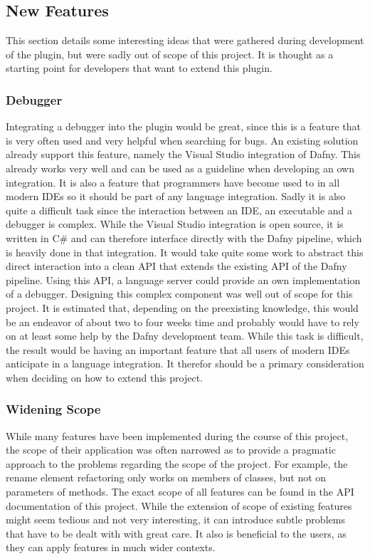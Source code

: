 \subsection{New Features} \label{featureExtensions}
This section details some interesting ideas that were gathered during development of the plugin, but were sadly out of scope of this project. It is thought as a starting point for developers that want to extend this plugin. 
\subsubsection{Debugger}
Integrating a debugger into the plugin would be great, since this is a feature that is very often used and very helpful when searching for bugs. An existing solution already support this feature, namely the Visual Studio integration \cite{visualstudiodafny} of Dafny. This already works very well and can be used as a guideline when developing an own integration. It is also a feature that programmers have become used to in all modern IDEs so it should be part of any language integration. \newline
Sadly it is also quite a difficult task since the interaction between an IDE, an executable and a debugger is complex. While the Visual Studio integration is open source, it is written in C\# and can therefore interface directly with the Dafny pipeline, which is heavily done in that integration. It would take quite some work to abstract this direct interaction into a clean API that extends the existing API of the Dafny pipeline. Using this API, a language server could provide an own implementation of a debugger.\newline
Designing this complex component was well out of scope for this project. It is estimated that, depending on the preexisting knowledge, this would be an endeavor of about two to four weeks time and probably would have to rely on at least some help by the Dafny development team. While this task is difficult, the result would be having an important feature that all users of modern IDEs anticipate in a language integration. It therefor should be a primary consideration when deciding on how to extend this project. 
\subsubsection{Widening Scope}
While many features have been implemented during the course of this project, the scope of their application was often narrowed as to provide a pragmatic approach to the problems regarding the scope of the project. For example, the rename element refactoring only works on members of classes, but not on parameters of methods. \newline
The exact scope of all features can be found in the API documentation of this project. While the extension of scope of existing features might seem tedious and not very interesting, it can introduce subtle problems that have to be dealt with with great care. It also is beneficial to the users, as they can apply features in much wider contexts. 
